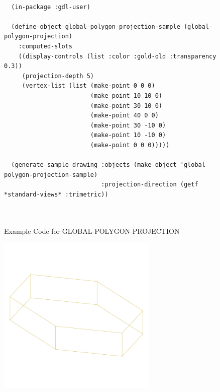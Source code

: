 \documentclass [11pt]{book}
\begin{document}
\begin{itemize}
\begin{description}
\end{description}




\begin{figure}
\begin{lrbox}{\boxedverb}
\begin{minipage}{\linewidth}
{\small

\begin{verbatim}

  (in-package :gdl-user)

  (define-object global-polygon-projection-sample (global-polygon-projection)
    :computed-slots
    ((display-controls (list :color :gold-old :transparency 0.3))
     (projection-depth 5)
     (vertex-list (list (make-point 0 0 0)
                        (make-point 10 10 0)
                        (make-point 30 10 0)
                        (make-point 40 0 0)
                        (make-point 30 -10 0)
                        (make-point 10 -10 0)
                        (make-point 0 0 0)))))

  (generate-sample-drawing :objects (make-object 'global-polygon-projection-sample)
                           :projection-direction (getf *standard-views* :trimetric))  

  
\end{verbatim}}
\end{minipage}
\end{lrbox}
\fbox{\usebox{\boxedverb}}

\caption{Example Code for GLOBAL-POLYGON-PROJECTION}

\label{fig:example-code-GLOBAL-POLYGON-PROJECTION}

\end{figure}

\begin{figure}
\begin{center}
\includegraphics[width=3in,height=3in]{../images/example-global-polygon-projection.pdf}
\end{center}


\end{figure}
\end{itemize}
\end{document}
